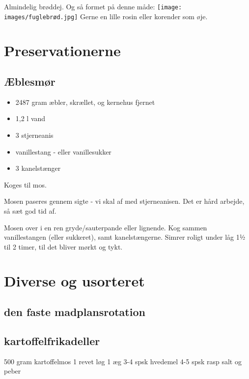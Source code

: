 \documentclass[
]{book}
\providecommand{\tightlist}{%
  \setlength{\itemsep}{0pt}\setlength{\parskip}{0pt}}
\begin{document}
Almindelig brøddej. Og så formet på denne måde:
\texttt{[image: images/fuglebrød.jpg]}
Gerne en lille rosin eller korender som øje.

\hypertarget{preservationerne}{%
\chapter{Preservationerne}\label{preservationerne}}

\hypertarget{uxe6blesmuxf8r}{%
\section{Æblesmør}\label{uxe6blesmuxf8r}}

\begin{itemize}
\tightlist
\item
  2487 gram æbler, skrællet, og kernehus fjernet
\item
  1,2 l vand
\item
  3 stjerneanis
\item
  vanillestang - eller vanillesukker
\item
  3 kanelstænger
\end{itemize}

Koges til mos.

Mosen paseres gennem sigte - vi skal af med stjerneanisen.
Det er hård arbejde, så sæt god tid af.

Mosen over i en ren gryde/sauterpande eller lignende.
Kog sammen vanillestangen (eller sukkeret), samt kanelstængerne.
Simrer roligt under låg 1½ til 2 timer, til det bliver mørkt og tykt.

\hypertarget{diverse-og-usorteret}{%
\chapter{Diverse og usorteret}\label{diverse-og-usorteret}}

\hypertarget{den-faste-madplansrotation}{%
\section{den faste madplansrotation}\label{den-faste-madplansrotation}}

\hypertarget{kartoffelfrikadeller}{%
\section{kartoffelfrikadeller}\label{kartoffelfrikadeller}}

500 gram kartoffelmos
1 revet løg
1 æg
3-4 spsk hvedemel
4-5 spsk rasp
salt og peber
\end{document}

